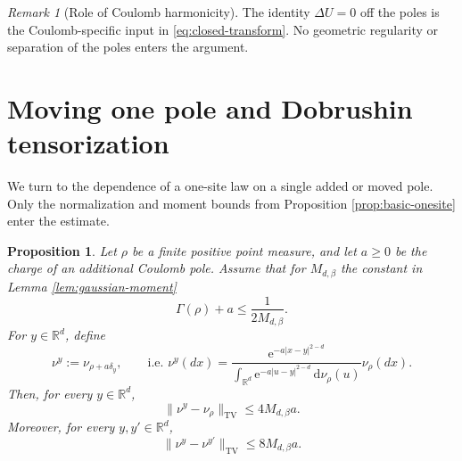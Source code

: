 \documentclass[12pt,reqno,letterpaper]{amsart}
\newtheorem{proposition}[theorem]{Proposition}
\theoremstyle{definition}
\theoremstyle{remark}
\newtheorem{remark}[theorem]{Remark}
\numberwithin{equation}{section}
\newcommand{\R}{\mathbb R}
\newcommand{\dd}{\,\mathrm d}
\newcommand{\ee}{\mathrm e}
\newcommand{\be}{\beta}
\newcommand{\TV}{\mathrm{TV}}
\begin{document}
\begin{remark}[Role of Coulomb harmonicity]\label{rem:coulomb-harmonicity}
The identity \(\Delta U=0\) off the poles is the Coulomb-specific input in
\eqref{eq:closed-transform}.  No geometric regularity or separation of the
poles enters the argument.
\end{remark}


\section{Moving one pole and Dobrushin tensorization}

We turn to the dependence of a one-site law on a single added or moved pole.
Only the normalization and moment bounds from Proposition
\ref{prop:basic-onesite} enter the estimate.

\begin{proposition}
\label{prop:moving-center}
Let \(\rho\) be a finite positive point measure, and let \(a\ge0\) be the
charge of an additional Coulomb pole.  Assume that for $M_{d,\beta}$ the constant in Lemma \ref{lem:gaussian-moment}
\[
 \Gamma(\rho)+a\le\frac{1}{2M_{d,\be}}.
\]
For \(y\in\R^d\), define
\[
 \nu^y:=\nu_{\rho+a\delta_y}, \qquad\text{i.e. }
 \nu^y(dx)
 =
 \frac{\ee^{-a|x-y|^{2-d}}}{
   \int_{\R^d}\ee^{-a|u-y|^{2-d}}\dd\nu_\rho(u)}
 \nu_\rho(dx).
\]
Then, for every \(y\in\R^d\),
\begin{equation}\label{eq:add-remove-TV}
 \|\nu^y-\nu_\rho\|_{\TV}
 \le4M_{d,\be}a.
\end{equation}
Moreover, for every \(y,y'\in\R^d\),
\begin{equation}\label{eq:move-TV}
 \|\nu^y-\nu^{y'}\|_{\TV}
 \le8M_{d,\be}a.
\end{equation}
\end{proposition}
\end{document}
